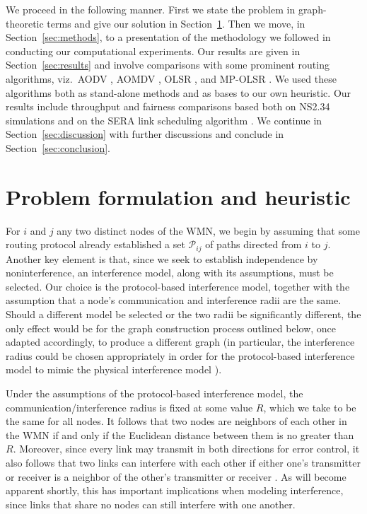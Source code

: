 \documentclass{article}
\begin{document}
We proceed in the following manner. First we state the problem in
graph-theoretic terms and give our solution in Section~\ref{sec:mra}. Then we
move, in Section~\ref{sec:methods}, to a presentation of the methodology we
followed in conducting our computational experiments. Our results are given in
Section~\ref{sec:results} and involve comparisons with some prominent routing
algorithms, viz.\ AODV \cite{Perkins1999}, AOMDV \cite{Marina2002}, OLSR
\cite{Jacquet2001}, and MP-OLSR \cite{Yi2011}. We used these algorithms both as
stand-alone methods and as bases to our own heuristic. Our results include
throughput and fairness \cite{Jain1998} comparisons based both on NS2.34
\cite{ns2} simulations and on the SERA link scheduling algorithm
\cite{Fabio2012}. We continue in Section~\ref{sec:discussion} with further
discussions and conclude in Section~\ref{sec:conclusion}.

\section{Problem formulation and heuristic}\label{sec:mra}

For $i$ and $j$ any two distinct nodes of the WMN, we begin by assuming that
some routing protocol already established a set $\mathcal{P}_{ij}$ of paths
directed from $i$ to $j$. Another key element is that, since we seek to
establish independence by noninterference, an interference model, along with its
assumptions, must be selected. Our choice is the protocol-based interference
model, together with the assumption that a node's communication and interference
radii are the same. Should a different model be selected or the two radii be
significantly different, the only effect would be for the graph construction
process outlined below, once adapted accordingly, to produce a different graph
(in particular, the interference radius could be chosen appropriately in order
for the protocol-based interference model to mimic the physical interference
model \cite{Shi2009}).

Under the assumptions of the protocol-based interference model, the
communication/interference radius is fixed at some value $R$, which we take to
be the same for all nodes. It follows that two nodes are neighbors of each other
in the WMN if and only if the Euclidean distance between them is no greater than
$R$. Moreover, since every link may transmit in both directions for error
control, it also follows that two links can interfere with each other if either
one's transmitter or receiver is a neighbor of the other's transmitter or
receiver \cite{Balakrishnan2004}. As will become apparent shortly, this has
important implications when modeling interference, since links that share no
nodes can still interfere with one another.
\end{document}
